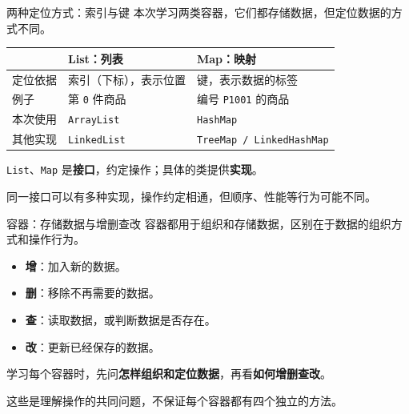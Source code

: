 \documentclass[aspectratio=169]{beamer}
\begin{document}
\begin{frame}{两种定位方式：索引与键}
  本次学习两类容器，它们都存储数据，但定位数据的方式不同。
  \par\bigskip
  \begin{center}
    \renewcommand{\arraystretch}{1.4}
    \begin{tabular}{lll}
      & \textbf{List：列表} & \textbf{Map：映射} \\
      \hline
      定位依据 & 索引（下标），表示位置 & 键，表示数据的标签 \\
      例子 & 第 \texttt{0} 件商品 & 编号 \texttt{P1001} 的商品 \\
      本次使用 & \texttt{ArrayList} & \texttt{HashMap} \\
      其他实现 & \texttt{LinkedList} & \texttt{TreeMap / LinkedHashMap} \\
    \end{tabular}
  \end{center}
  \bigskip
  \texttt{List}、\texttt{Map} 是\textbf{接口}，约定操作；具体的类提供\textbf{实现}。
  \par\medskip
  同一接口可以有多种实现，操作约定相通，但顺序、性能等行为可能不同。
\end{frame}

\begin{frame}{容器：存储数据与增删查改}
  容器都用于\alert{组织和存储数据}，区别在于数据的组织方式和操作行为。
  \par\bigskip
  \begin{itemize}
    \item \textbf{增}：加入新的数据。
    \item \textbf{删}：移除不再需要的数据。
    \item \textbf{查}：读取数据，或判断数据是否存在。
    \item \textbf{改}：更新已经保存的数据。
  \end{itemize}
  \bigskip
  学习每个容器时，先问\textbf{怎样组织和定位数据}，再看\textbf{如何增删查改}。
  \par\medskip
  这些是理解操作的共同问题，不保证每个容器都有四个独立的方法。
\end{frame}

\end{document}
